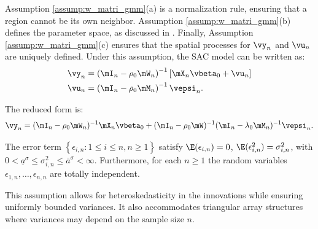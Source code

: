 \documentclass[english,12pt]{book}\usepackage[]{graphicx}\usepackage[]{xcolor}
\begin{document}
Assumption \ref{assump:w_matri_gmm}(a) is a normalization rule, ensuring that a region cannot be its own neighbor. Assumption \ref{assump:w_matri_gmm}(b) defines the parameter space, as discussed in \citet[section 2.2]{kelejian2010specification}. Finally, Assumption \ref{assump:w_matri_gmm}(c) ensures that the spatial processes for $\vy_n$ and $\vu_n$ are uniquely defined. Under this assumption, the SAC model can be written as:
\begin{equation*}
	\begin{aligned}
	\vy_n  & = \left(\mI_n - \rho_0 \mW_n\right)^{-1}\left[\mX_n\vbeta_0 + \vu_n\right] \\
	\vu_n  & = \left(\mI_n -  \rho_0 \mM_n\right)^{-1}\vepsi_n.
	\end{aligned}
\end{equation*}

The reduced form is:
\begin{equation*}
\vy_n = (\mI_n - \rho_0\mW_n)^{-1}\mX_n\vbeta_0 +(\mI_n -\rho_0\mW)^{-1}(\mI_n - \lambda_0\mM_n)^{-1}\vepsi_n. 
\end{equation*}

% 


\begin{assumption}\label{assump:error_hete_gmm} 
	The error term  $\left\lbrace\epsilon_{i,n}: 1 \leq i \leq n, n\geq 1\right\rbrace$ satisfy $\E(\epsilon_{i,n}) = 0$, $\E(\epsilon_{i,n}^2) = \sigma^2_{i,n}$, with $0 < \underline{a}^\sigma \leq \sigma^2_{i,n}\leq \overline{a}^\sigma<\infty$. Furthermore, for each $n\geq 1$ the random variables $\epsilon_{1,n}, \ldots, \epsilon_{n,n}$ are totally independent.  
\end{assumption}

This assumption allows for heteroskedasticity in the innovations while ensuring uniformly bounded variances. It also accommodates triangular array structures where variances may depend on the sample size $n$. 
\end{document}
